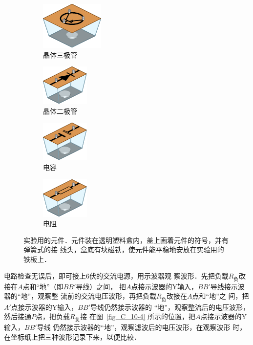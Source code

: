 \begin{figure}[htbp]
    \centering
    \begin{subfigure}{0.3\linewidth}
        \centering
        \includegraphics{fig/C/10-5a.pdf}
        \caption{晶体三极管}\label{fig_C_10-5a}
    \end{subfigure}
    \hfil
    \begin{subfigure}{0.2\linewidth}
        \centering
        \includegraphics{fig/C/10-5b.pdf}
        \caption{晶体二极管}\label{fig_C_10-5b}
    \end{subfigure}
    \hfil
    \begin{subfigure}{0.2\linewidth}
        \centering
        \includegraphics{fig/C/10-5c.pdf}
        \caption{电容}\label{fig_C_10-5c}
    \end{subfigure}
    \hfil
    \begin{subfigure}{0.2\linewidth}
        \centering
        \includegraphics{fig/C/10-5d.pdf}
        \caption{电阻}\label{fig_C_10-5d}
    \end{subfigure}
    \caption{实验用的元件．元件装在透明塑料盒内，盖上画着元件的符号，并有弹簧式的接
    线头，盒底有块磁铁，使元件能平稳地安放在实验用的铁板上．}
\end{figure}

电路检查无误后，即可接上6伏的交流电源，用示波器观
察波形．先把负载$R_{\text{负}}$改接在$A$点和“地”（即$BB'$导线）之间，
把$A$点接示波器的Y输入，$BB'$导线接示波器的“地”，观察整
流前的交流电压波形，再把负载$R_{\text{负}}$改接在$A$点和“地”之
间，把$A'$点接示波器的Y输入，$BB'$导线仍然接示波器的
“地”，观察整流后的电压波形，然后接通$P$点，把负载$R_{\text{负}}$接
在图~\ref{fig_C_10-4} 所示的位置，把$A$点接示波器的Y输入，$BB'$导线
仍然接示波器的“地”，观察滤波后的电压波形，在观察波形
时，在坐标纸上把三种波形记录下来，以便比较．


